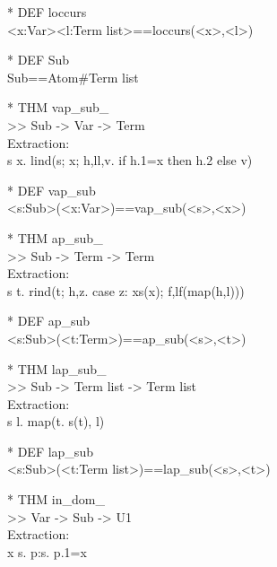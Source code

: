 \begin{prl*}
\>* DEF loccurs\\
\>  <x:Var>\mepsilon{}<l:Term list>==loccurs(<x>,<l>)
\end{prl*}

\begin{prl*}
\>* DEF Sub\\
\>  Sub==Atom\#Term list
\end{prl*}

\begin{prl*}
\>* THM vap\_sub\_\\
\>  >> Sub -> Var -> Term\\
\>  Extraction:\\
\>  \mlambda{} s x. lind(s; x; h,ll,v. if h.1=x then h.2 else v)
\end{prl*}

\begin{prl*}
\>* DEF vap\_sub\\
\>  <s:Sub>(<x:Var>)==vap\_sub(<s>,<x>)
\end{prl*}

\begin{prl*}
\>* THM ap\_sub\_\\
\>  >> Sub -> Term -> Term\\
\>  Extraction:\\
\>  \mlambda{} s t. rind(t; h,z. case z: x\mrightarrow{}s(x); f,l\mrightarrow{}f(map(h,l)))
\end{prl*}

\begin{prl*}
\>* DEF ap\_sub\\
\>  <s:Sub>(<t:Term>)==ap\_sub(<s>,<t>)
\end{prl*}

\begin{prl*}
\>* THM lap\_sub\_\\
\>  >> Sub -> Term list -> Term list\\
\>  Extraction:\\
\>  \mlambda{} s l. map(\mlambda{}t. s(t), l)
\end{prl*}

\begin{prl*}
\>* DEF lap\_sub\\
\>  <s:Sub>(<t:Term list>)==lap\_sub(<s>,<t>)
\end{prl*}

\begin{prl*}
\>* THM in\_dom\_\\
\>  >> Var -> Sub -> U1\\
\>  Extraction:\\
\>  \mlambda{} x s. \mexists{}p:s. p.1=x
\end{prl*}

